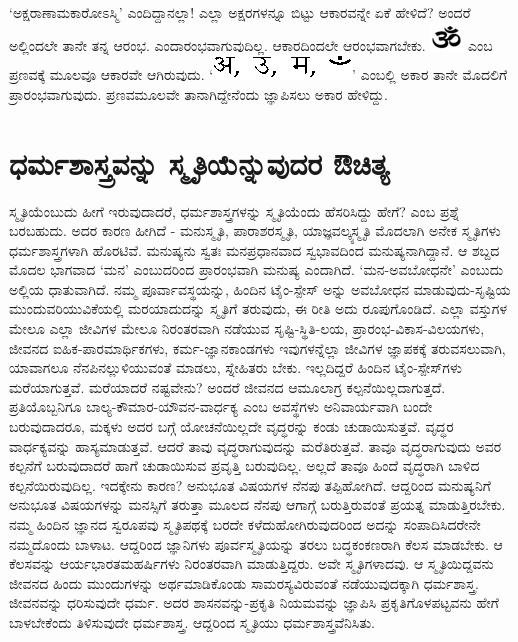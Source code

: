 `ಅಕ್ಷರಾಣಾಮಕಾರೋಽಸ್ಮಿ'\label{93} ಎಂದಿದ್ದಾನಲ್ಲಾ! ಎಲ್ಲಾ ಅಕ್ಷರಗಳನ್ನೂ ಬಿಟ್ಟು ಆಕಾರವನ್ನೇ ಏಕೆ ಹೇಳಿದೆ? ಅಂದರೆ ಅಲ್ಲಿಂದಲೇ ತಾನೇ ತನ್ನ ಆರಂಭ. {} ಎಂದಾರಂಭವಾಗುವುದಿಲ್ಲ. ಆಕಾರದಿಂದಲೇ ಆರಂಭವಾಗಬೇಕು. \includegraphics{Om-PNG.eps} ಎಂಬ ಪ್ರಣವಕ್ಕೆ ಮೂಲವೂ ಆಕಾರವೇ ಆಗಿರುವುದು. `\includegraphics{symbol.eps}' ಎಂಬಲ್ಲಿ ಅಕಾರ ತಾನೇ ಮೊದಲಿಗೆ ಪ್ರಾರಂಭವಾಗುವುದು. ಪ್ರಣವಮೂಲವೇ ತಾನಾಗಿದ್ದೇನೆಂದು ಜ್ಞಾಪಿಸಲು ಅಕಾರ ಹೇಳಿದ್ದು. 

\section*{ಧರ್ಮಶಾಸ್ತ್ರವನ್ನು ಸ್ಮೃತಿಯೆನ್ನುವುದರ ಔಚಿತ್ಯ}

ಸ್ಮೃತಿಯೆಂಬುದು ಹೀಗೆ ಇರುವುದಾದರೆ, ಧರ್ಮಶಾಸ್ತ್ರಗಳನ್ನು ಸ್ಮೃತಿಯೆಂದು ಹೆಸರಿಸಿದ್ದು ಹೇಗೆ? ಎಂಬ ಪ್ರಶ್ನೆ ಬರಬಹುದು. ಅದರ ಕಾರಣ ಹೀಗಿದೆ - ಮನುಸ್ಮೃತಿ, ಪಾರಾಶರಸ್ಮೃತಿ, ಯಾಜ್ಞವಲ್ಕ್ಯಸ್ಮೃತಿ ಮೊದಲಾಗಿ ಅನೇಕ ಸ್ಮೃತಿಗಳು ಧರ್ಮಶಾಸ್ತ್ರಗಳಾಗಿ ಹೊರಟಿವೆ. ಮನುಷ್ಯನು ಸ್ವತಃ ಮನಪ್ರಧಾನವಾದ ಸ್ವಭಾವದಿಂದ ಮನುಷ್ಯನಾಗಿದ್ದಾನೆ. ಆ ಶಬ್ದದ ಮೊದಲ ಭಾಗವಾದ `ಮನ' ಎಂಬುದರಿಂದ ಪ್ರಾರಂಭವಾಗಿ ಮನುಷ್ಯ ಎಂದಾಗಿದೆ. `ಮನ-ಅವಬೋಧನೇ' ಎಂಬುದು ಅಲ್ಲಿಯ ಧಾತುವಾಗಿದೆ. ನಮ್ಮ ಪೂರ್ವಾವಸ್ಥಯನ್ನು, ಹಿಂದಿನ ಟೈಂ-ಸ್ಪೇಸ್ ಅನ್ನು ಅವಬೋಧನ ಮಾಡುವುದು-ಸೃಷ್ಟಿಯ ಮುಂದುವರಿಯುವಿಕೆಯಲ್ಲಿ ಮರಯಾದುದನ್ನು ಸ್ಮೃತಿಗೆ ತರುವುದು, ಈ ರೀತಿ ಅದು ರೂಪುಗೊಂಡಿದೆ. ಎಲ್ಲಾ ವಸ್ತುಗಳ ಮೇಲೂ ಎಲ್ಲಾ ಜೀವಿಗಳ ಮೇಲೂ ನಿರಂತರವಾಗಿ ನಡೆಯುವ ಸೃಷ್ಟಿ-ಸ್ಥಿತಿ-ಲಯ, ಪ್ರಾರಂಭ-ವಿಕಾಸ-ವಿಲಯಗಳು, ಜೀವನದ ಐಹಿಕ-ಪಾರಮಾರ್ಥಿಕಗಳು, ಕರ್ಮ-ಜ್ಞಾನಕಾಂಡಗಳು ಇವುಗಳನ್ನೆಲ್ಲಾ ಜೀವಿಗಳ ಜ್ಞಾಪಕಕ್ಕೆ ತರುವಸಲುವಾಗಿ, ಯಾವಾಗಲೂ ನೆನಪಿನಲ್ಲುಳಿಯುವಂತೆ ಮಾಡಲು, ಸ್ನೇಹಿತರು ಬೇಕು. ಇಲ್ಲದಿದ್ದರೆ ಹಿಂದಿನ ಟೈಂ-ಸ್ಪೇಸ್‌ಗಳು ಮರೆಯಾಗುತ್ತವೆ. ಮರೆಯಾದರೆ ನಷ್ಟವೇನು? ಅಂದರೆ ಜೀವನದ ಆಮೂಲಾಗ್ರ ಕಲ್ಪನೆಯಿಲ್ಲದಾಗುತ್ತದೆ. ಪ್ರತಿಯೊಬ್ಬನಿಗೂ ಬಾಲ್ಯ-ಕೌಮಾರ-ಯೌವನ-ವಾರ್ಧಕ್ಯ ಎಂಬ ಅವಸ್ಥೆಗಳು ಅನಿವಾರ್ಯವಾಗಿ ಬಂದೇ ಬರುವುದಾದರೂ, ಮಕ್ಕಳು ಅದರ ಬಗ್ಗೆ ಯೋಚನೆಯಿಲ್ಲದೇ ವೃದ್ಧರನ್ನು ಕಂಡು ಚುಡಾಯಿಸುತ್ತವೆ. ವೃದ್ಧರ ವಾರ್ಧಕ್ಯವನ್ನು ಹಾಸ್ಯಮಾಡುತ್ತವೆ. ಆದರೆ ತಾವು ವೃದ್ಧರಾಗುವುದನ್ನು ಮರೆತಿರುತ್ತವೆ. ತಾವೂ ವೃದ್ಧರಾಗುವುದು ಅವರ ಕಲ್ಪನೆಗೆ ಬರುವುದಾದರೆ ಹಾಗೆ ಚುಡಾಯಿಸುವ ಪ್ರವೃತ್ತಿ ಬರುವುದಿಲ್ಲ. ಅಲ್ಲದೆ ತಾವೂ ಹಿಂದೆ ವೃದ್ಧರಾಗಿ ಬಾಳಿದ ಕಲ್ಪನೆಯಿರುವುದಿಲ್ಲ. ಇದಕ್ಕೇನು ಕಾರಣ? ಅನುಭೂತ ವಿಷಯಗಳ ನೆನಪು ತಪ್ಪಿಹೋಗಿದೆ. ಆದ್ದರಿಂದ ಮನುಷ್ಯನಿಗೆ ಅನುಭೂತ ವಿಷಯಗಳನ್ನು ಮನಸ್ಸಿಗೆ ತರುತ್ತಾ ಮೂಲದ ನೆನಪು ಆಗಾಗ್ಗೆ ಬರುತ್ತಿರುವಂತೆ ಪ್ರಯತ್ನ ಮಾಡುತ್ತಿರಬೇಕು. ನಮ್ಮ ಹಿಂದಿನ ಜ್ಞಾನದ ಸ್ವರೂಪವು ಸ್ಮೃತಿಪಥಕ್ಕೆ ಬರದೇ ಕಳೆದುಹೋಗಿರುವುದರಿಂದ ಅದನ್ನು ಸಂಪಾದಿಸಿದರೇನೇ ನಮ್ಮದೊಂದು ಬಾಳಾಟ. ಆದ್ದರಿಂದ ಜ್ಞಾನಿಗಳು ಪೂರ್ವಸ್ಮೃತಿಯನ್ನು ತರಲು ಬದ್ಧಕಂಕಣರಾಗಿ ಕೆಲಸ ಮಾಡಬೇಕು. ಆ ಕೆಲಸವನ್ನು ಆರ್ಯಭಾರತಮಹರ್ಷಿಗಳು ನಿರಂತರವಾಗಿ ಮಾಡುತ್ತಿದ್ದರು. ಅವೇ ಸ್ಮೃತಿಗಳಾದವು. ಆ ಸ್ಮೃತಿಯಿದ್ದವನು ಜೀವನದ ಹಿಂದು ಮುಂದುಗಳನ್ನು ಅರ್ಥಮಾಡಿಕೊಂಡು ಸಾಮರಸ್ಯವಿರುವಂತೆ ನಡೆಯುವುದಕ್ಕಾಗಿ ಧರ್ಮಶಾಸ್ತ್ರ. ಜೀವನವನ್ನು ಧರಿಸುವುದೇ ಧರ್ಮ. ಅದರ ಶಾಸನವನ್ನು-ಪ್ರಕೃತಿ ನಿಯಮವನ್ನು ಜ್ಞಾಪಿಸಿ ಪ್ರಕೃತಿಗೊಳಪಟ್ಟವನು ಹೇಗೆ ಬಾಳಬೇಕೆಂದು ತಿಳಿಸುವುದೇ ಧರ್ಮಶಾಸ್ತ್ರ. ಆದ್ದರಿಂದ ಸ್ಮೃತಿಯು ಧರ್ಮಶಾಸ್ತ್ರವೆನಿಸಿತು.

